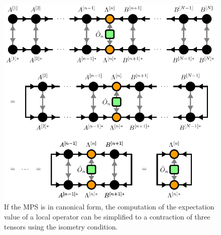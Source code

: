 \begin{figure}
	\centering
	\includegraphics[scale=1.0]{figures/tikz/Tensor_Networks/mps_canonical_form_local_expectation_value/mps_canonical_form_local_expectation_value.pdf}
	\caption{If the MPS is in canonical form, the computation of the expectation value of a local operator can be simplified to a contraction of three tensors using the isometry condition.}
	\label{fig:mps_local_expectation_value_canonical}
\end{figure}
